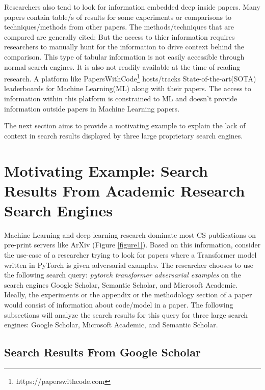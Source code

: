 Researchers also tend to look for information embedded deep inside papers. Many papers contain table/s of results for some experiments or comparisons to techniques/methods from other papers. The methods/techniques that are compared are generally cited; But the access to thier information requires researchers to manually hunt for the information to drive context behind the comparison. This type of tabular information is not easily accessible through normal search engines. It is also not readily available at the time of reading research. A platform like PapersWithCode\footnote{https://paperswithcode.com} hosts/tracks State-of-the-art(SOTA) leaderboards for Machine Learning(ML) along with their papers. The access to information within this platform is constrained to ML and doesn't provide information outside papers in Machine Learning papers. 

The next section aims to provide a motivating example to explain the lack of context in search results displayed by three large proprietary search engines.

\section{Motivating Example: Search Results From Academic Research Search Engines}
Machine Learning and deep learning research dominate most CS publications on pre-print servers like ArXiv (Figure \ref{figure1}).
Based on this information, consider the use-case of a researcher trying to look for papers where a Transformer\parencite{vaswani2017attention} model written in PyTorch\parencite{paszke2019pytorch} is given adversarial examples. 
The researcher chooses to use the following search query: \textit{pytorch transformer adversarial examples} on the search engines Google Scholar, Semantic Scholar, and Microsoft Academic. 
Ideally, the experiments or the appendix or the methodology section of a paper would consist of information about code/model in a paper. 
The following subsections will analyze the search results for this query for three large search engines: Google Scholar, Microsoft Academic, and Semantic Scholar. 
\pagebreak
\subsection{Search Results From Google Scholar}
\label{sr-g}

